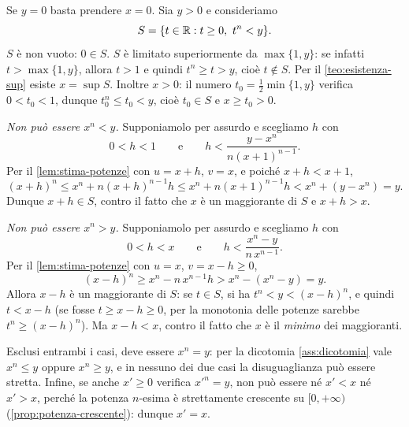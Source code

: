 \begin{dimostrazione}
Se $y=0$ basta prendere $x=0$. Sia $y>0$ e consideriamo
\[
  S=\{t\in\R : t\ge0,\ t^{n}<y\}.
\]
$S$ è non vuoto: $0\in S$. $S$ è limitato superiormente da $\max\{1,y\}$: se infatti
$t>\max\{1,y\}$, allora $t>1$ e quindi $t^{n}\ge t>y$, cioè $t\notin S$. Per il
\cref{teo:esistenza-sup} esiste $x=\sup S$. Inoltre $x>0$: il numero
$t_{0}=\frac12\min\{1,y\}$ verifica $0<t_{0}<1$, dunque $t_{0}^{n}\le t_{0}<y$, cioè
$t_{0}\in S$ e $x\ge t_{0}>0$.

\emph{Non può essere $x^{n}<y$.} Supponiamolo per assurdo e scegliamo $h$ con
\[
  0<h<1 \qquad\text{e}\qquad h<\frac{y-x^{n}}{n(x+1)^{n-1}} .
\]
Per il \cref{lem:stima-potenze} con $u=x+h$, $v=x$, e poiché $x+h<x+1$,
\[
  (x+h)^{n}\le x^{n}+n(x+h)^{n-1}h\le x^{n}+n(x+1)^{n-1}h<x^{n}+(y-x^{n})=y .
\]
Dunque $x+h\in S$, contro il fatto che $x$ è un maggiorante di $S$ e $x+h>x$.

\emph{Non può essere $x^{n}>y$.} Supponiamolo per assurdo e scegliamo $h$ con
\[
  0<h<x \qquad\text{e}\qquad h<\frac{x^{n}-y}{n\,x^{n-1}} .
\]
Per il \cref{lem:stima-potenze} con $u=x$, $v=x-h\ge0$,
\[
  (x-h)^{n}\ge x^{n}-n\,x^{n-1}h>x^{n}-(x^{n}-y)=y .
\]
Allora $x-h$ è un maggiorante di $S$: se $t\in S$, si ha $t^{n}<y<(x-h)^{n}$, e quindi
$t<x-h$ (se fosse $t\ge x-h\ge0$, per la monotonia delle potenze sarebbe
$t^{n}\ge(x-h)^{n}$). Ma $x-h<x$, contro il fatto che $x$ è il \emph{minimo} dei
maggioranti.

Esclusi entrambi i casi, deve essere $x^{n}=y$: per la dicotomia
\ref{ass:dicotomia} vale $x^{n}\le y$ oppure $x^{n}\ge y$, e in nessuno dei due casi la
disuguaglianza può essere stretta. Infine, se anche $x'\ge0$ verifica
$x'^{n}=y$, non può essere né $x'<x$ né $x'>x$, perché la potenza $n$-esima è
strettamente crescente su $[0,+\infty)$ (\cref{prop:potenza-crescente}): dunque $x'=x$.
\end{dimostrazione}

\begin{marginfigure}
\centering
{}
\caption{La dimostrazione del \cref{teo:radice-n} (qui $n=3$, $y=4$): l'insieme $S$ dei
$t\ge0$ con $t^{n}<y$ è l'intervallo $[0,x)$, e il suo estremo superiore $x$ è la
radice cercata.}
\label{fig:radice-sup}
\end{marginfigure}

